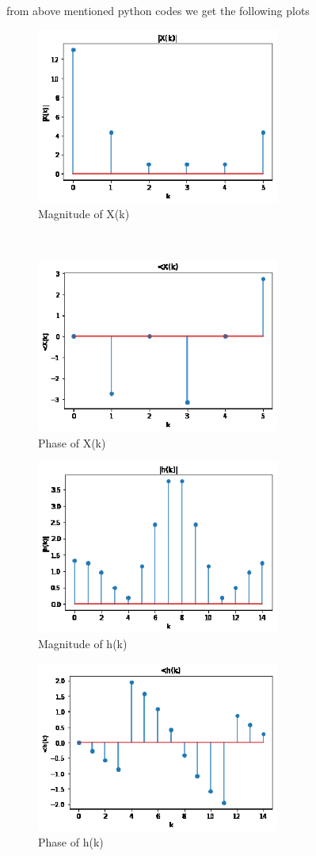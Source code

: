 \documentclass[journal,12pt,twocolumn]{IEEEtran}
\begin{document}
\newpage
from above mentioned python codes we get  the following plots\\
\begin{figure}[h!]
    \centering
    \includegraphics[width=8cm]{./figures/abs_X(k).eps}
    \caption{Magnitude of X(k)}
    \label{|X(k)|}
\end{figure} \\
\begin{figure}[h!]
    \centering
    \includegraphics[width=8cm]{./figures/angle_X(k).eps}
    \caption{Phase of X(k)}
    \label{/_X(k)}
\end{figure}
\begin{figure}[h!]
    \centering
    \includegraphics[width=8cm]{./figures/abs_h(k).eps}
    \caption{Magnitude of h(k)}
    \label{|h(k)|}
\end{figure} 
\newpage
\begin{figure}[h!]
    \centering
    \includegraphics[width=8cm]{./figures/angle_h(k).eps}
    \caption{Phase of h(k)}
    \label{/_X(k)}
\end{figure}   
\end{document}
